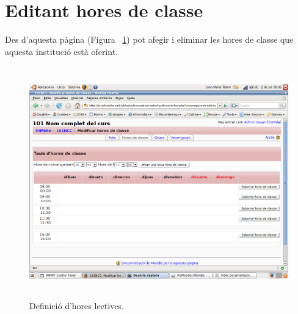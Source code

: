 \documentclass[a4paper]{report}  %
\begin{document}
\section{Editant hores de classe}
Des d'aquesta pàgina (Figura ~\ref{fig:Hourtable}) pot afegir i eliminar les hores de classe que aquesta institució està oferint.
		\begin{figure}[H] %
		\begin{center}
		\includegraphics[height=10cm,width=12cm]{img/Hourtable.png}
		\caption[List caption]{Definició d'hores lectives.}
		\label{fig:Hourtable}
		\end{center}
		\end{figure}
\end{document}
